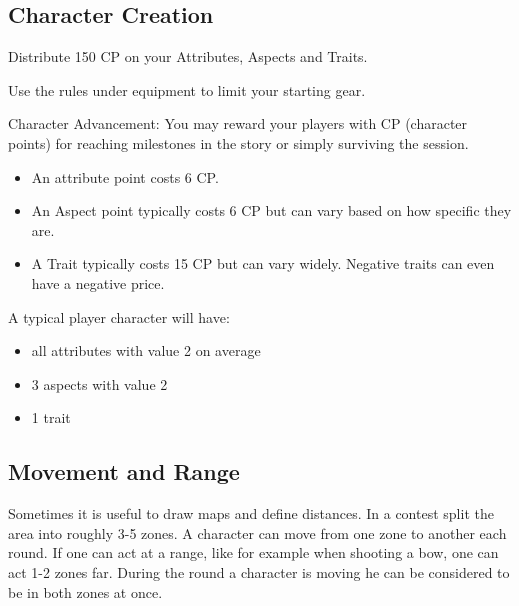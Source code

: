 \documentclass[11pt]{article}
\begin{document}
{\subsection{Character Creation}
\label{sec:org7863b9b}
\begin{short}
Distribute 150 CP on your Attributes, Aspects and Traits.

Use the rules under equipment to limit your starting gear.

Character Advancement:
You may reward your players with CP (character points) for reaching milestones in the story or simply surviving the session.

\begin{itemize}
\item An attribute point costs 6 CP.
\item An Aspect point typically costs 6 CP but can vary based on how specific they are.
\item A Trait typically costs 15 CP but can vary widely. Negative traits can even have a negative price.
\end{itemize}

A typical player character will have:
\begin{itemize}
\item all attributes with value 2 on average
\item 3 aspects with value 2
\item 1 trait
\end{itemize}
\end{short}
\subsection{Movement and Range}
\label{sec:org6130709}
\begin{short}
Sometimes it is useful to draw maps and define distances. In a contest split the area into roughly 3-5 zones. A character can move from one zone to another each round. If one can act at a range, like for example when shooting a bow, one can act 1-2 zones far. During the round a character is moving he can be considered to be in both zones at once.
\end{short}
}
\end{document}
